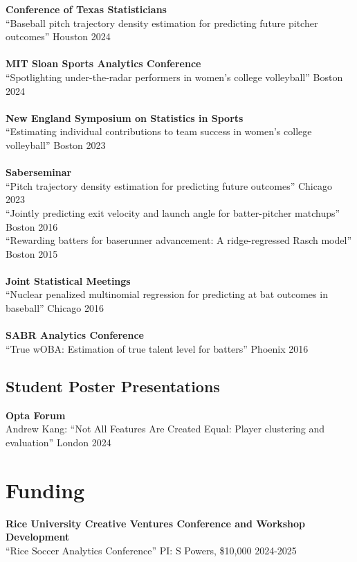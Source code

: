 \documentclass{article}
\begin{document}
{\bf Conference of Texas Statisticians}\\
``Baseball pitch trajectory density estimation for predicting future pitcher outcomes'' \hfill Houston 2024\\
~\\
{\bf MIT Sloan Sports Analytics Conference}\\
``Spotlighting under-the-radar performers in women's college volleyball'' \hfill Boston 2024\\
~\\
{\bf New England Symposium on Statistics in Sports}\\
``Estimating individual contributions to team success in women's college volleyball'' \hfill Boston 2023\\
~\\
{\bf Saberseminar}\\
``Pitch trajectory density estimation for predicting future outcomes'' \hfill Chicago 2023\\
``Jointly predicting exit velocity and launch angle for batter-pitcher matchups'' \hfill Boston 2016\\
``Rewarding batters for baserunner advancement: A ridge-regressed Rasch model'' \hfill Boston 2015\\
~\\
{\bf Joint Statistical Meetings}\\
``Nuclear penalized multinomial regression for predicting at bat outcomes in baseball'' \hfill Chicago 2016\\
~\\
{\bf SABR Analytics Conference}\\
``True wOBA: Estimation of true talent level for batters'' \hfill Phoenix 2016

\subsection*{\sc Student Poster Presentations}

{\bf Opta Forum}\\
Andrew Kang: ``Not All Features Are Created Equal: Player clustering and evaluation''  \hfill London 2024


\section*{\sc Funding}

{\bf Rice University Creative Ventures Conference and Workshop Development}\\
``Rice Soccer Analytics Conference'' PI: S Powers, \$10,000 \hfill 2024-2025
\end{document}
